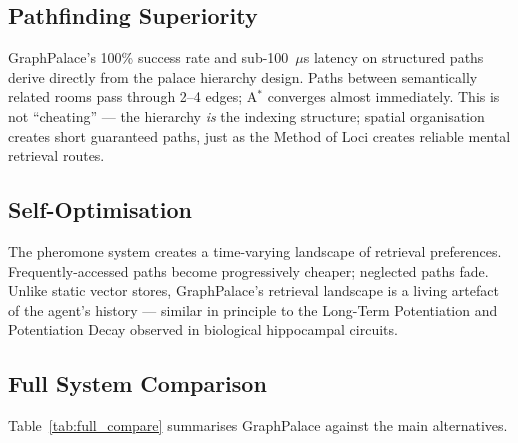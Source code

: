 \documentclass[11pt,a4paper]{article}
\begin{document}
\subsection{Pathfinding Superiority}

GraphPalace's 100\% success rate and sub-100~$\mu$s latency on structured paths
derive directly from the palace hierarchy design.  Paths between semantically
related rooms pass through 2--4 edges; A$^*$ converges almost immediately.
This is not ``cheating'' --- the hierarchy \emph{is} the indexing structure;
spatial organisation creates short guaranteed paths, just as the Method of Loci
creates reliable mental retrieval routes.

\subsection{Self-Optimisation}

The pheromone system creates a time-varying landscape of retrieval preferences.
Frequently-accessed paths become progressively cheaper; neglected paths fade.
Unlike static vector stores, GraphPalace's retrieval landscape is a living
artefact of the agent's history --- similar in principle to the Long-Term
Potentiation and Potentiation Decay observed in biological hippocampal circuits.

\subsection{Full System Comparison}

Table~\ref{tab:full_compare} summarises GraphPalace against the main
alternatives.
\end{document}

